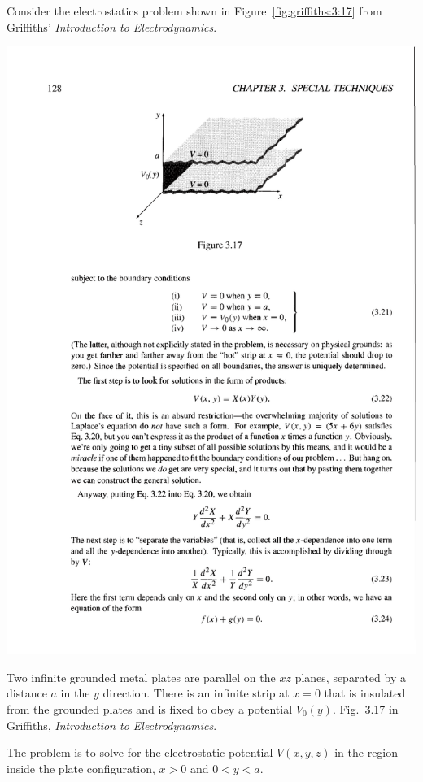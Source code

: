 \documentclass[12pt, oneside]{report}    %
\begin{document}
Consider the electrostatics problem shown in Figure~\ref{fig:griffiths:3:17} from Griffiths' \emph{Introduction to Electrodynamics}.
\begin{marginfigure}
    \centering
    \includegraphics[width=\textwidth]{figures/GriffithsEM3_17.pdf}
    \caption{Two infinite grounded metal plates are parallel on the $xz$ planes, separated by a distance $a$ in the $y$ direction. There is an infinite strip at $x=0$ that is insulated from the grounded plates and is fixed to obey a potential $V_0(y)$. Fig.~3.17 in Griffiths, \emph{Introduction to Electrodynamics}.}
    \label{fig:griffiths:3:17}
\end{marginfigure}
The problem is to solve for the electrostatic potential $V(x,y,z)$ in the region inside the plate configuration, $x>0$ and $0<y<a$.
\end{document}
